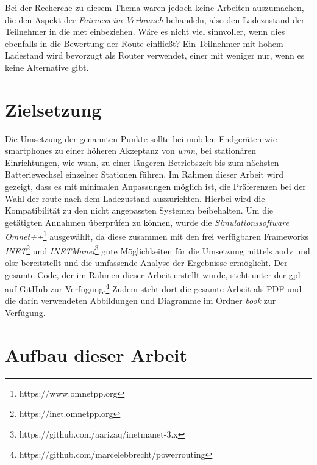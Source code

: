 Bei der Recherche zu diesem Thema waren jedoch keine Arbeiten auszumachen, die den Aspekt der \textit{Fairness im Verbrauch} behandeln, also den Ladezustand der Teilnehmer in die \gls{met} einbeziehen. Wäre es nicht viel sinnvoller, wenn dies ebenfalls in die Bewertung der Route einfließt? Ein Teilnehmer mit hohem Ladestand wird bevorzugt als Router verwendet, einer mit weniger nur, wenn es keine Alternative gibt. 

\section{Zielsetzung}

Die Umsetzung der genannten Punkte sollte bei mobilen Endgeräten wie \glspl{smartphone} zu einer höheren Akzeptanz von \textit{\gls{wmn}}, bei stationären Einrichtungen, wie \gls{wsan}, zu einer längeren Betriebszeit bis zum nächsten Batteriewechsel einzelner Stationen führen. Im Rahmen dieser Arbeit wird gezeigt, dass es mit minimalen Anpassungen möglich ist, die Präferenzen bei der Wahl der \gls{route} nach dem Ladezustand auszurichten. Hierbei wird die Kompatibilität zu den nicht angepassten Systemen beibehalten. Um die getätigten Annahmen überprüfen zu können, wurde die \textit{Simulationssoftware Omnet++}\footnote{https://www.omnetpp.org} ausgewählt, da diese zusammen mit den frei verfügbaren Frameworks \textit{INET}\footnote{https://inet.omnetpp.org} und \textit{INETManet}\footnote{https://github.com/aarizaq/inetmanet-3.x} gute Möglichkeiten für die Umsetzung mittels \gls{aodv} und \gls{olsr} bereitstellt und die umfassende Analyse der Ergebnisse ermöglicht. Der gesamte Code, der im Rahmen dieser Arbeit erstellt wurde, steht unter der \gls{gpl} auf GitHub zur Verfügung.\footnote{https://github.com/marcelebbrecht/powerrouting} Zudem steht dort die gesamte Arbeit als PDF und die darin verwendeten Abbildungen und Diagramme im Ordner \textit{book} zur Verfügung.
 
\section{Aufbau dieser Arbeit}

